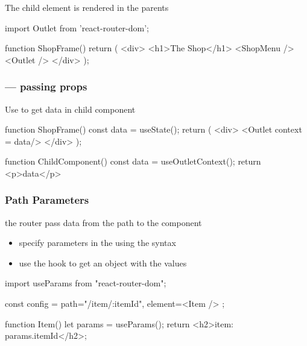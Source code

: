 \begin{frame}[fragile] \frametitle{}
The child element is rendered in the parents 

\vspace{5mm}
\begin{CodeBox}{}
import { Outlet } from 'react-router-dom';

function ShopFrame() {
  return (
    <div>
      <h1>The Shop</h1>
      <ShopMenu />
      <Outlet />
    </div>
  );
}
\end{CodeBox}
\end{frame}

\begin{frame}[fragile] \frametitle{ --- passing props}
Use  to get data in child component
\begin{CodeBox}{}
function ShopFrame() {
  const data = useState();
  return (
    <div>
      <Outlet context = data/>
    </div>
  );
}

function ChildComponent() {
    const { data } = useOutletContext();
    return <p>{data}</p>
}
\end{CodeBox}
\end{frame}

\begin{frame}[fragile] \frametitle{Path Parameters}
the router pass data from the path to the component
\begin{itemize}
  \item specify parameters in the  using the syntax
  \item use the   hook to get an object with the values
\end{itemize}

\vspace{5mm}
\begin{CodeBox}{}
import { useParams } from "react-router-dom";

const config = {
    path="/item/:itemId", 
    element={<Item />}
};

function Item() {
  let params = useParams();
  return <h2>item: {params.itemId}</h2>;
}
\end{CodeBox}
\end{frame}


